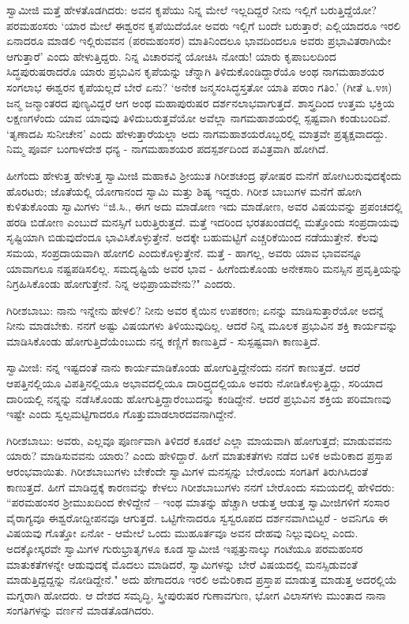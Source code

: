 ಸ್ವಾಮೀಜಿ ಮತ್ತೆ ಹೇಳತೊಡಗಿದರು: ಅವನ ಕೃಪೆಯು ನಿನ್ನ ಮೇಲೆ ಇಲ್ಲದಿದ್ದರೆ ನೀನು ಇಲ್ಲಿಗೆ ಬರುತ್ತಿದ್ದೆಯೋ? ಪರಮಹಂಸರು ‘ಯಾರ ಮೇಲೆ ಈಶ್ವರನ ಕೃಪೆಯಿದೆಯೋ ಅವರು ಇಲ್ಲಿಗೆ ಬಂದೇ ಬರುತ್ತಾರೆ; ಎಲ್ಲಿಯಾದರೂ ಇರಲಿ ಏನಾದರೂ ಮಾಡಲಿ ಇಲ್ಲಿರುವವನ (ಪರಮಹಂಸರ) ಮಾತಿನಿಂದಲೂ ಭಾವದಿಂದಲೂ ಅವರು ಪ್ರಭಾವಿತರಾಗಿಯೇ ಆಗುತ್ತಾರೆ’ ಎಂದು ಹೇಳುತ್ತಿದ್ದರು. ನಿನ್ನ ವಿಚಾರವನ್ನೆ ಯೋಚಿಸಿ ನೋಡು! ಯಾರು ಕೃಪಾಬಲದಿಂದ ಸಿದ್ಧಪುರುಷರಾದರೊ ಯಾರು ಪ್ರಭುವಿನ ಕೃಪೆಯನ್ನು ಚೆನ್ನಾಗಿ ತಿಳಿದುಕೊಂಡಿದ್ದಾರೆಯೊ ಅಂಥ ನಾಗಮಹಾಶಯರ ಸಂಗಲಾಭ ಈಶ್ವರನ ಕೃಪೆಯಲ್ಲದೆ ಬೇರೆ ಏನು? ‘ಅನೇಕ ಜನ್ಮಸಂಸಿದ್ಧಸ್ತತೋ ಯಾತಿ ಪರಾಂ ಗತಿಂ.’ (ಗೀತೆ ೬.೪೫) ಜನ್ಮ ಜನ್ಮಾಂತರದ ಪುಣ್ಯವಿದ್ದರೆ ಆಗ ಅಂಥ ಮಹಾಪುರುಷರ ದರ್ಶನಲಾಭವಾಗುತ್ತದೆ. ಶಾಸ್ತ್ರದಿಂದ ಉತ್ತಮ ಭಕ್ತಿಯ ಲಕ್ಷಣಗಳೆಂದು ಯಾವ ಯಾವುವು ತಿಳಿದುಬರುತ್ತವೆಯೋ ಅವೆಲ್ಲಾ ನಾಗಮಹಾಶಯರಲ್ಲಿ ಸ್ಪಷ್ಟವಾಗಿ ಕಂಡುಬಂದಿವೆ. ‘ತೃಣಾದಪಿ ಸುನೀಚೇನ’ ಎಂದು ಹೇಳುತ್ತಾರೆಯಲ್ಲಾ ಅದು ನಾಗಮಹಾಶಯರೊಬ್ಬರಲ್ಲಿ ಮಾತ್ರವೇ ಪ್ರತ್ಯಕ್ಷವಾದದ್ದು. ನಿಮ್ಮ ಪೂರ್ವ ಬಂಗಾಳದೇಶ ಧನ್ಯ - ನಾಗಮಹಾಶಯರ ಪದಸ್ಪರ್ಶದಿಂದ ಪವಿತ್ರವಾಗಿ ಹೋಗಿದೆ.

ಹೀಗೆಂದು ಹೇಳುತ್ತ ಹೇಳುತ್ತ ಸ್ವಾಮೀಜಿ ಮಹಾಕವಿ ಶ‍್ರೀಯುತ ಗಿರೀಶಚಂದ್ರ ಘೋಷರ ಮನೆಗೆ ಹೋಗಿಬರುವುದಕ್ಕೆಂದು ಹೊರಟರು; ಜೊತೆಯಲ್ಲಿ ಯೋಗಾನಂದ ಸ್ವಾಮಿ ಮತ್ತು ಶಿಷ್ಯ ಇದ್ದರು. ಗಿರೀಶ ಬಾಬುಗಳ ಮನೆಗೆ ಹೋಗಿ ಕುಳಿತುಕೊಂಡು ಸ್ವಾಮಿಗಳು “ಜಿ.ಸಿ., ಈಗ ಅದು ಮಾಡೋಣ ಇದು ಮಾಡೋಣ, ಅವರ ವಿಷಯವನ್ನು ಪ್ರಪಂಚದಲ್ಲಿ ಹರಡಿ ಬಿಡೋಣ ಎಂಬುದೆ ಮನಸ್ಸಿಗೆ ಬರುತ್ತಿರುತ್ತದೆ. ಮತ್ತೆ ಇದರಿಂದ ಭರತಖಂಡದಲ್ಲಿ ಮತ್ತೊಂದು ಸಂಪ್ರದಾಯವು ಸೃಷ್ಟಿಯಾಗಿ ಬಿಡುವುದೆಂದೂ ಭಾವಿಸಿಕೊಳ್ಳುತ್ತೇನೆ. ಅದಕ್ಕೇ ಬಹುಮಟ್ಟಿಗೆ ಎಚ್ಚರಿಕೆಯಿಂದ ನಡೆಯುತ್ತೇನೆ. ಕೆಲವು ಸಮಯ, ಸಂಪ್ರದಾಯವಾಗಿ ಹೋಗಲಿ ಎಂದುಕೊಳ್ಳುತ್ತೇನೆ. ಮತ್ತೆ - ಹಾಗಲ್ಲ, ಅವರು ಯಾವ ಭಾವವನ್ನೂ ಯಾವಾಗಲೂ ನಷ್ಟಪಡಿಸಲಿಲ್ಲ. ಸಮದೃಷ್ಟಿಯೆ ಅವರ ಭಾವ - ಹೀಗೆಂದುಕೊಂಡು ಅನೇಕಸಾರಿ ಮನಸ್ಸಿನ ಪ್ರವೃತ್ತಿಯನ್ನು ನಿಗ್ರಹಿಸಿಕೊಂಡು ಹೋಗುತ್ತೇನೆ. ನಿನ್ನ ಅಭಿಪ್ರಾಯವೇನು?" ಎಂದರು.

ಗಿರೀಶಬಾಬು: ನಾನು ಇನ್ನೇನು ಹೇಳಲಿ? ನೀನು ಅವರ ಕೈಯಿನ ಉಪಕರಣ; ಏನನ್ನು ಮಾಡಿಸುತ್ತಾರೆಯೋ ಅದನ್ನೆ ನೀನು ಮಾಡಬೇಕು. ನನಗೆ ಅಷ್ಟು ವಿಷಯಗಳು ತಿಳಿಯುವುದಿಲ್ಲ. ಆದರೆ ನಿನ್ನ ಮೂಲಕ ಪ್ರಭುವಿನ ಶಕ್ತಿ ಕಾರ್ಯವನ್ನು ಮಾಡಿಸಿಕೊಂಡು ಹೋಗುತ್ತಿದೆಯೆಂಬುದು ನನ್ನ ಕಣ್ಣಿಗೆ ಕಾಣುತ್ತಿದೆ - ಸುಸ್ಪಷ್ಟವಾಗಿ ಕಾಣುತ್ತಿದೆ.

ಸ್ವಾಮೀಜಿ: ನನ್ನ ಇಷ್ಟದಂತೆ ನಾನು ಕಾರ್ಯಮಾಡಿಕೊಂಡು ಹೋಗುತ್ತಿದ್ದೇನೆಂದು ನನಗೆ ಕಾಣುತ್ತದೆ. ಆದರೆ ಆಪತ್ತಿನಲ್ಲಿಯೂ ವಿಪತ್ತಿನಲ್ಲಿಯೂ ಅಭಾವದಲ್ಲಿಯೂ ದಾರಿದ್ರ್ಯದಲ್ಲಿಯೂ ಅವರು ನೋಡಿಕೊಳ್ಳುತ್ತಿದ್ದು, ಸರಿಯಾದ ದಾರಿಯಲ್ಲಿ ನನ್ನನ್ನು ನಡೆಸಿಕೊಂಡು ಹೋಗುತ್ತಿದ್ದಾರೆಂಬುದನ್ನು ಕಂಡಿದ್ದೇನೆ. ಆದರೆ ಪ್ರಭುವಿನ ಶಕ್ತಿಯ ಪರಿಮಾಣವು ಇಷ್ಟೇ ಎಂದು ಸ್ವಲ್ಪಮಟ್ಟಿಗಾದರೂ ಗೊತ್ತುಮಾಡಲಾರದವನಾಗಿದ್ದೇನೆ.

ಗಿರೀಶಬಾಬು: ಅವರು, ಎಲ್ಲವೂ ಪೂರ್ಣವಾಗಿ ತಿಳಿದರೆ ಕೂಡಲೆ ಎಲ್ಲಾ ಮಾಯವಾಗಿ ಹೋಗುತ್ತದೆ; ಮಾಡುವವನು ಯಾರು? ಮಾಡಿಸುವವನು ಯಾರು? ಎಂದು ಹೇಳಿದ್ದಾರೆ. ಹೀಗೆ ಮಾತುಕತೆಗಳು ನಡೆದ ಬಳಿಕ ಅಮೆರಿಕಾದ ಪ್ರಸ್ತಾಪ ಆರಂಭವಾಯಿತು. ಗಿರೀಶಬಾಬುಗಳು ಬೇಕೆಂದೇ ಸ್ವಾಮಿಗಳ ಮನಸ್ಸನ್ನು ಬೇರೊಂದು ಸಂಗತಿಗೆ ತಿರುಗಿಸಿದಂತೆ ಕಾಣುತ್ತದೆ. ಹೀಗೆ ಮಾಡಿದ್ದಕ್ಕೆ ಕಾರಣವನ್ನು ಕೇಳಲು ಗಿರೀಶಬಾಬುಗಳು ನನಗೆ ಬೇರೊಂದು ಸಮಯದಲ್ಲಿ ಹೇಳಿದರು: “ಪರಮಹಂಸರ ಶ‍್ರೀಮುಖದಿಂದ ಕೇಳಿದ್ದೇನೆ – ಇಂಥ ಮಾತನ್ನು ಹೆಚ್ಚಾಗಿ ಆಡುತ್ತ ಆಡುತ್ತ ಸ್ವಾಮೀಜಿಗಳಿಗೆ ಸಂಸಾರ ವೈರಾಗ್ಯವೂ ಈಶ್ವರೋದ್ದೀಪನವೂ ಆಗುತ್ತದೆ. ಒಟ್ಟಿಗೇನಾದರೂ ಸ್ವಸ್ವರೂಪದ ದರ್ಶನವಾಗಿಬಿಟ್ಟರೆ - ಅವನಿಗೂ ಈ ವಿಷಯವು ಗೊತ್ತೋ ಏನೋ - ಆಮೇಲೆ ಒಂದು ಮುಹೂರ್ತವೂ ಅವನ ದೇಹವು ನಿಲ್ಲುವುದಿಲ್ಲ ಎಂದು. ಅದಕ್ಕೋಸ್ಕರವೇ ಸ್ವಾಮಿಗಳ ಗುರುಭ್ರಾತೃಗಳೂ ಕೂಡ ಸ್ವಾಮೀಜಿ ಇಪ್ಪತ್ತುನಾಲ್ಕು ಗಂಟೆಯೂ ಪರಮಹಂಸರ ಮಾತುಕತೆಗಳನ್ನೇ ಆಡುವುದಕ್ಕೆ ಮೊದಲು ಮಾಡಿದರೆ, ಸ್ವಾಮಿಗಳನ್ನು ಬೇರೆ ವಿಷಯದಲ್ಲಿ ಮನಸ್ಸಿಡುವಂತೆ ಮಾಡುತ್ತಿದ್ದದ್ದನ್ನು ನೋಡಿದ್ದೇನೆ." ಅದು ಹೇಗಾದರೂ ಇರಲಿ ಅಮೆರಿಕಾದ ಪ್ರಸ್ತಾಪ ಮಾಡುತ್ತ ಮಾಡುತ್ತ ಅದರಲ್ಲಿಯೆ ಮಗ್ನರಾಗಿ ಹೋದರು. ಆ ದೇಶದ ಸಮೃದ್ಧಿ, ಸ್ತ್ರೀಪುರುಷರ ಗುಣಾವಗುಣ, ಭೋಗ ವಿಲಾಸಗಳು ಮುಂತಾದ ನಾನಾ ಸಂಗತಿಗಳನ್ನು ವರ್ಣನೆ ಮಾಡತೊಡಗಿದರು.

